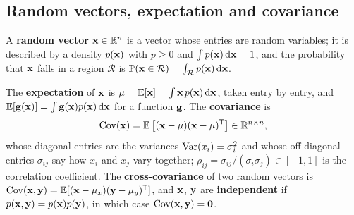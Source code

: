 \subsection{Random vectors, expectation and covariance}

A \textbf{random vector} $\mathbf{x} \in \mathbb{R}^n$ is a vector
whose entries are random variables; it is described by a density $p(\mathbf{x})$
with $p \ge 0$ and $\int p(\mathbf{x})\,\mathrm{d}\mathbf{x} = 1$, and the probability
that $\mathbf{x}$ falls in a region $\mathcal{R}$ is $\mathbb{P}(\mathbf{x} \in \mathcal{R})
= \int_{\mathcal{R}} p(\mathbf{x})\,\mathrm{d}\mathbf{x}$.

\begin{definition}
\label{def:appB-covariance}
The \textbf{expectation} of $\mathbf{x}$ is $\mathbf{\mu} = \mathbb{E}[\mathbf{x}] = \int \mathbf{x}\,p(\mathbf{x})\,\mathrm{d}\mathbf{x}$, taken entry by entry, and $\mathbb{E}[\mathbf{g}(\mathbf{x})] = \int \mathbf{g}(\mathbf{x})p(\mathbf{x})\,\mathrm{d}\mathbf{x}$ for a function $\mathbf{g}$. The \textbf{covariance} is
\begin{equation}
  \operatorname{Cov}(\mathbf{x}) = \mathbb{E}\left[(\mathbf{x} - \mathbf{\mu})(\mathbf{x} - \mathbf{\mu})^{\mathsf{T}}\right] \in \mathbb{R}^{n \times n},
  \label{eq:appB-cov}
\end{equation}
whose diagonal entries are the variances $\operatorname{Var}(x_i) = \sigma_i^2$ and whose off-diagonal entries $\sigma_{ij}$ say how $x_i$ and $x_j$ vary together; $\rho_{ij} = \sigma_{ij}/(\sigma_i\sigma_j) \in [-1, 1]$ is the correlation coefficient. The \textbf{cross-covariance} of two random vectors is $\operatorname{Cov}(\mathbf{x}, \mathbf{y}) = \mathbb{E}[(\mathbf{x} - \mathbf{\mu}_x)(\mathbf{y} - \mathbf{\mu}_y)^{\mathsf{T}}]$, and $\mathbf{x}$, $\mathbf{y}$ are \textbf{independent} if $p(\mathbf{x}, \mathbf{y}) = p(\mathbf{x})p(\mathbf{y})$, in which case $\operatorname{Cov}(\mathbf{x}, \mathbf{y}) = \mathbf{0}$.
\end{definition}

